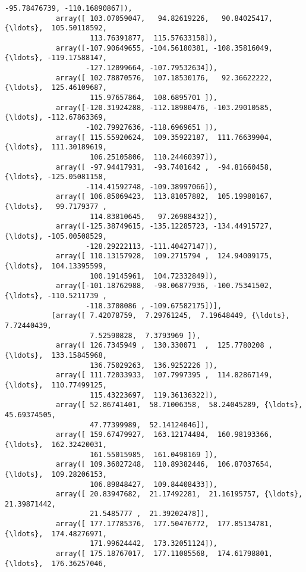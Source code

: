 \documentclass[11pt]{article}
\begin{document}
\begin{Verbatim}[commandchars=\\\{\}]
                    -95.78476739, -110.16890867]),
            array([ 103.07059047,   94.82619226,   90.84025417, {\ldots},  105.50118592,
                    113.76391877,  115.57633158]),
            array([-107.90649655, -104.56180381, -108.35816049, {\ldots}, -119.17588147,
                   -127.12099664, -107.79532634]),
            array([ 102.78870576,  107.18530176,   92.36622222, {\ldots},  125.46109687,
                    115.97657864,  108.6895701 ]),
            array([-120.31924288, -112.18980476, -103.29010585, {\ldots}, -112.67863369,
                   -102.79927636, -118.6969651 ]),
            array([ 115.55920624,  109.35922187,  111.76639904, {\ldots},  111.30189619,
                    106.25105806,  110.24460397]),
            array([ -97.94417931,  -93.7401642 ,  -94.81660458, {\ldots}, -125.05081158,
                   -114.41592748, -109.38997066]),
            array([ 106.85069423,  113.81057882,  105.19980167, {\ldots},   99.7179377 ,
                    114.83810645,   97.26988432]),
            array([-125.38749615, -135.12285723, -134.44915727, {\ldots}, -105.00508529,
                   -128.29222113, -111.40427147]),
            array([ 110.13157928,  109.2715794 ,  124.94009175, {\ldots},  104.13395599,
                    100.19145961,  104.72332849]),
            array([-101.18762988,  -98.06877936, -100.75341502, {\ldots}, -110.5211739 ,
                   -118.3708086 , -109.67582175])],
           [array([ 7.42078759,  7.29761245,  7.19648449, {\ldots},  7.72440439,
                    7.52590828,  7.3793969 ]),
            array([ 126.7345949 ,  130.330071  ,  125.7780208 , {\ldots},  133.15845968,
                    136.75029263,  136.9252226 ]),
            array([ 111.72033933,  107.7997395 ,  114.82867149, {\ldots},  110.77499125,
                    115.43223697,  119.36136322]),
            array([ 52.86741401,  58.71006358,  58.24045289, {\ldots},  45.69374505,
                    47.77399989,  52.14124046]),
            array([ 159.67479927,  163.12174484,  160.98193366, {\ldots},  162.32420031,
                    161.55015985,  161.0498169 ]),
            array([ 109.36027248,  110.89382446,  106.87037654, {\ldots},  109.28206153,
                    106.89848427,  109.84408433]),
            array([ 20.83947682,  21.17492281,  21.16195757, {\ldots},  21.39871442,
                    21.5485777 ,  21.39202478]),
            array([ 177.17785376,  177.50476772,  177.85134781, {\ldots},  174.48276971,
                    171.99624442,  173.32051124]),
            array([ 175.18767017,  177.11085568,  174.61798801, {\ldots},  176.36257046,

\end{Verbatim}
\end{document}
